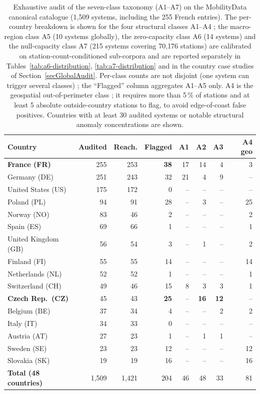 \documentclass[11pt,a4paper]{article}
\begin{document}
\begin{table}[ht]
\centering
\caption{Exhaustive audit of the seven-class taxonomy
(A1--A7) on the MobilityData canonical catalogue
(1{,}509 systems, including the 255 French entries). The
per-country breakdown is shown for the four structural classes
A1--A4 ; the macro-region class A5 (10 systems globally), the
zero-capacity class A6 (14 systems) and the null-capacity class
A7 (215 systems covering 70{,}176 stations) are calibrated on
station-count-conditioned sub-corpora and are reported separately
in Tables~\ref{tab:a6-distribution}, \ref{tab:a7-distribution}
and in the country case studies of
Section~\ref{secGlobalAudit}. Per-class counts are not disjoint
(one system can trigger several classes) ; the ``Flagged'' column
aggregates A1--A5 only. A4 is the geospatial out-of-perimeter
class ; it requires more than 5\,\% of stations and at least 5
absolute outside-country stations to flag, to avoid edge-of-coast
false positives. Countries with at least 30 audited systems or
notable structural anomaly concentrations are shown.}
\label{tab:global-audit}
\small
\begin{tabular}{@{}lrrrrrrr@{}}
\toprule
\textbf{Country} & \textbf{Audited} & \textbf{Reach.} & \textbf{Flagged}
   & \textbf{A1} & \textbf{A2} & \textbf{A3} & \textbf{A4 geo}\\
\midrule
\textbf{France (FR)}      & 255 & 253 & \textbf{38} & 17 & 14 &  4 &  3 \\
Germany (DE)              & 251 & 243 & 32 & 21 &  4 &  9 & -- \\
United States (US)        & 175 & 172 &  0 & -- & -- & -- & -- \\
Poland (PL)               &  94 &  91 & 28 & -- &  3 & -- & 25 \\
Norway (NO)               &  83 &  46 &  2 & -- & -- & -- &  2 \\
Spain (ES)                &  69 &  66 &  1 & -- & -- & -- &  1 \\
United Kingdom (GB)       &  56 &  54 &  3 & -- &  1 & -- &  2 \\
Finland (FI)              &  55 &  55 & 14 & -- & -- & -- & 14 \\
Netherlands (NL)          &  52 &  52 &  1 & -- & -- & -- &  1 \\
Switzerland (CH)          &  49 &  46 & 15 &  8 &  3 &  3 &  1 \\
\textbf{Czech Rep.\ (CZ)} &  45 &  43 & \textbf{25} & -- & \textbf{16} & \textbf{12} & -- \\
Belgium (BE)              &  37 &  34 &  4 & -- & -- &  2 &  2 \\
Italy (IT)                &  34 &  33 &  0 & -- & -- & -- & -- \\
Austria (AT)              &  27 &  23 &  1 & -- &  1 &  1 & -- \\
Sweden (SE)               &  23 &  23 & 12 & -- & -- & -- & 12 \\
Slovakia (SK)             &  19 &  19 & 16 & -- & -- & -- & 16 \\
\midrule
\textbf{Total (48 countries)} & 1{,}509 & 1{,}421 & 204 & 46 & 48 & 33 & 81 \\
\bottomrule
\end{tabular}
\end{table}
\end{document}
